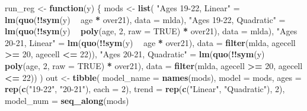 \documentclass[]{book}
\newenvironment{Shaded}{\begin{snugshade}}{\end{snugshade}}
\newcommand{\KeywordTok}[1]{\textcolor[rgb]{0.13,0.29,0.53}{\textbf{#1}}}
\newcommand{\DataTypeTok}[1]{\textcolor[rgb]{0.13,0.29,0.53}{#1}}
\newcommand{\DecValTok}[1]{\textcolor[rgb]{0.00,0.00,0.81}{#1}}
\newcommand{\StringTok}[1]{\textcolor[rgb]{0.31,0.60,0.02}{#1}}
\newcommand{\OtherTok}[1]{\textcolor[rgb]{0.56,0.35,0.01}{#1}}
\newcommand{\ControlFlowTok}[1]{\textcolor[rgb]{0.13,0.29,0.53}{\textbf{#1}}}
\newcommand{\OperatorTok}[1]{\textcolor[rgb]{0.81,0.36,0.00}{\textbf{#1}}}
\newcommand{\NormalTok}[1]{#1}
\theoremstyle{definition}
\theoremstyle{definition}
\theoremstyle{definition}
\theoremstyle{remark}
\begin{document}
\begin{Shaded}
\begin{Highlighting}[]
\NormalTok{run_reg <-}\StringTok{ }\ControlFlowTok{function}\NormalTok{(y) \{}
\NormalTok{  mods <-}\StringTok{ }\KeywordTok{list}\NormalTok{(}
    \StringTok{"Ages 19-22, Linear"}\NormalTok{ =}
\StringTok{      }\KeywordTok{lm}\NormalTok{(}\KeywordTok{quo}\NormalTok{(}\OperatorTok{!!}\KeywordTok{sym}\NormalTok{(y) }\OperatorTok{~}\StringTok{ }\NormalTok{age }\OperatorTok{*}\StringTok{ }\NormalTok{over21), }\DataTypeTok{data =}\NormalTok{ mlda),}
    \StringTok{"Ages 19-22, Quadratic"}\NormalTok{ =}
\StringTok{      }\KeywordTok{lm}\NormalTok{(}\KeywordTok{quo}\NormalTok{(}\OperatorTok{!!}\KeywordTok{sym}\NormalTok{(y) }\OperatorTok{~}\StringTok{ }\KeywordTok{poly}\NormalTok{(age, }\DecValTok{2}\NormalTok{, }\DataTypeTok{raw =} \OtherTok{TRUE}\NormalTok{) }\OperatorTok{*}\StringTok{ }\NormalTok{over21), }\DataTypeTok{data =}\NormalTok{ mlda),}
    \StringTok{"Ages 20-21, Linear"}\NormalTok{ =}
\StringTok{      }\KeywordTok{lm}\NormalTok{(}\KeywordTok{quo}\NormalTok{(}\OperatorTok{!!}\KeywordTok{sym}\NormalTok{(y) }\OperatorTok{~}\StringTok{ }\NormalTok{age }\OperatorTok{*}\StringTok{ }\NormalTok{over21),}
             \DataTypeTok{data =} \KeywordTok{filter}\NormalTok{(mlda, agecell }\OperatorTok{>=}\StringTok{ }\DecValTok{20}\NormalTok{, agecell }\OperatorTok{<=}\StringTok{ }\DecValTok{22}\NormalTok{)),}
    \StringTok{"Ages 20-21, Quadratic"}\NormalTok{ =}
\StringTok{      }\KeywordTok{lm}\NormalTok{(}\KeywordTok{quo}\NormalTok{(}\OperatorTok{!!}\KeywordTok{sym}\NormalTok{(y) }\OperatorTok{~}\StringTok{ }\KeywordTok{poly}\NormalTok{(age, }\DecValTok{2}\NormalTok{, }\DataTypeTok{raw =} \OtherTok{TRUE}\NormalTok{) }\OperatorTok{*}\StringTok{ }\NormalTok{over21),}
             \DataTypeTok{data =} \KeywordTok{filter}\NormalTok{(mlda, agecell }\OperatorTok{>=}\StringTok{ }\DecValTok{20}\NormalTok{, agecell }\OperatorTok{<=}\StringTok{ }\DecValTok{22}\NormalTok{))}
\NormalTok{  )}
\NormalTok{  out <-}\StringTok{ }\KeywordTok{tibble}\NormalTok{(}
    \DataTypeTok{model_name =} \KeywordTok{names}\NormalTok{(mods),}
    \DataTypeTok{model =}\NormalTok{ mods,}
    \DataTypeTok{ages =} \KeywordTok{rep}\NormalTok{(}\KeywordTok{c}\NormalTok{(}\StringTok{"19-22"}\NormalTok{, }\StringTok{"20-21"}\NormalTok{), }\DataTypeTok{each =} \DecValTok{2}\NormalTok{),}
    \DataTypeTok{trend =} \KeywordTok{rep}\NormalTok{(}\KeywordTok{c}\NormalTok{(}\StringTok{"Linear"}\NormalTok{, }\StringTok{"Quadratic"}\NormalTok{), }\DecValTok{2}\NormalTok{),}
    \DataTypeTok{model_num =} \KeywordTok{seq_along}\NormalTok{(mods)}

\end{Highlighting}
\end{Shaded}
\end{document}
